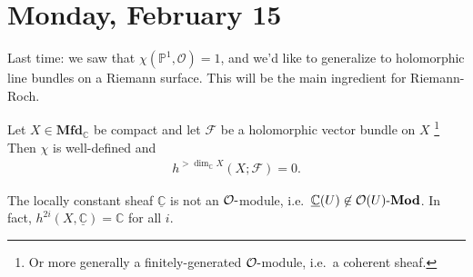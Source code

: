 \hypertarget{monday-february-15}{%
\section{Monday, February 15}\label{monday-february-15}}

\begin{remark}

Last time: we saw that \(\chi({\mathbb{P}}^1, {\mathcal{O}}) = 1\), and
we'd like to generalize to holomorphic line bundles on a Riemann
surface. This will be the main ingredient for Riemann-Roch.

\end{remark}

\begin{theorem}[?]

Let \(X \in {\mathbf{Mfd}}_{\mathbb{C}}\) be compact and let
\(\mathcal{F}\) be a holomorphic vector bundle on \(X\) \footnote{Or
  more generally a finitely-generated \({\mathcal{O}}{\hbox{-}}\)module,
  i.e.~a coherent sheaf.} Then \(\chi\) is well-defined and
\begin{align*} h^{> \dim_{\mathbb{C}}X}(X; \mathcal{F} ) = 0.\end{align*}

\end{theorem}

\begin{remark}

The locally constant sheaf \(\underline{{\mathbb{C}}}\) is not an
\({\mathcal{O}}{\hbox{-}}\)module,
i.e.~\(\underline{{\mathbb{C}}}(U) \not\in {{{\mathcal{O}}(U)}{\hbox{-}}\mathbf{Mod}}\).
In fact, \(h^{2i}(X, \underline{{\mathbb{C}}}) = {\mathbb{C}}\) for all
\(i\).

\end{remark}

